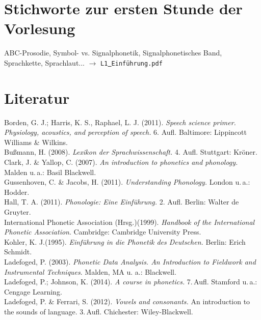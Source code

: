 \section{Stichworte zur ersten Stunde der Vorlesung} 

ABC-Prosodie,  Symbol- vs. Signalphonetik, Signalphonetisches Band, Sprachkette, Sprachlaut... $\rightarrow$ {\tt L1\underline{\ }Einführung.pdf} 


\section{Literatur}

Borden, G. J.; Harris, K. S., Raphael, L. J. (2011). \emph{Speech science primer. Physiology, acoustics, and perception of speech.} 6. Aufl. Baltimore: Lippincott Williams \& Wilkins. \newline\\
Bußmann, H. (2008). \emph{Lexikon der Sprachwissenschaft.} 4. Aufl. Stuttgart: Kröner. \newline\\
Clark, J. \& Yallop, C. (2007). \emph{An introduction to phonetics and phonology.} Malden u.\,a.:  Basil Blackwell.\newline\\
Gussenhoven, C. \& Jacobs, H. (2011). \emph{Understanding Phonology.} London  u.\,a.: Hodder.\newline\\
Hall, T. A. (2011).\emph{ Phonologie: Eine Einführung.} 2. Aufl. Berlin: Walter de Gruyter. \newline\\
International Phonetic Association (Hrsg.)(1999). \emph{Handbook of the International Phonetic Association}. Cambridge: Cambridge University Press. \newline\\
Kohler, K. J.(1995). \emph{Einführung in die Phonetik des Deutschen.} Berlin: Erich Schmidt. \newline\\
Ladefoged, P. (2003). \emph{Phonetic Data Analysis. An Introduction to Fieldwork and Instrumental Techniques}. Malden, MA u. a.: Blackwell.\newline\\
Ladefoged, P.; Johnson, K.  (2014). \emph{A course in phonetics.} 7.\,Aufl. Stamford u.\,a.: Cengage Learning. \newline\\
Ladefoged, P. \& Ferrari, S. (2012). \emph{Vowels and consonants.} An introduction to the sounds of language. 3.\,Aufl. Chichester: Wiley-Blackwell. \newline\\
